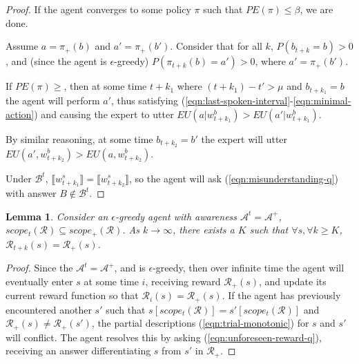 \documentclass{article}
\newtheorem{lemma}{Lemma}
\begin{document}
		\begin{proof}
			If the agent converges to some policy $\pi$ such that $PE(\pi) \leq \beta$, we are done.
			
			Assume $a = \pi_+(b)$ and $a' = \pi_+(b')$. Consider that for all $k$, $P(b_{t+k} = b) > 0$, and (since the agent is $\epsilon$-greedy) $P(\pi_{t+k}(b) = a') > 0$, where $a' = \pi_+(b')$. 
			
			If $PE(\pi) \geq$, then at some time $t + k_1$ where $(t + k_1) - t' > \mu$ and $b_{t + k_1} = b$ the agent will perform $a'$, thus satisfying (\ref{eqn:last-spoken-interval}-\ref{eqn:minimal-action}) and causing the expert to utter $EU(a | w^b_{t + k_1}) > EU(a' | w^b_{t + k_1})$.
			
			By similar reasoning, at some time $b_{t + k_2} = b'$ the expert will utter $EU(a', w^b_{t + k_2}) > EU(a, w^b_{t + k_2})$.
			
			Under $\mathcal{B}^t$, $\llbracket w^s_{t + k_1} \rrbracket = \llbracket w^s_{t + k_2} \rrbracket$, so the agent will ask (\ref{eqn:misunderstanding-q}) with answer $B \notin \mathcal{B}^t$.
		\end{proof}
		
		\begin{lemma}
			Consider an $\epsilon$-greedy agent with awareness $\mathcal{A}^t = \mathcal{A}^+$, $scope_t(\mathcal{R}) \subseteq scope_+(\mathcal{R})$. As $k \rightarrow \infty$, there exists a $K$ such that $\forall s, \forall k \geq K$, $\mathcal{R}_{t+k}(s) = \mathcal{R}_{+}(s)$.
		\end{lemma}
		\begin{proof}
			Since the $\mathcal{A}^t = \mathcal{A}^+$, and is $\epsilon$-greedy, then over infinite time the agent will eventually enter $s$ at some time $i$, receiving reward $\mathcal{R}_+(s)$, and update its current reward function so that $\mathcal{R}_{i}(s) = \mathcal{R}_+(s)$. If the agent has previously encountered another $s'$ such that $s[scope_t(\mathcal{R})] = s'[scope_t(\mathcal{R})]$ and $\mathcal{R}_+(s) \neq \mathcal{R}_+(s')$, the partial descriptions (\ref{eqn:trial-monotonic}) for $s$ and $s'$ will conflict. The agent resolves this by asking (\ref{eqn:unforeseen-reward-q}), receiving an answer differentiating $s$ from $s'$ in $\mathcal{R}_+$. 
		\end{proof}
		
\end{document}
